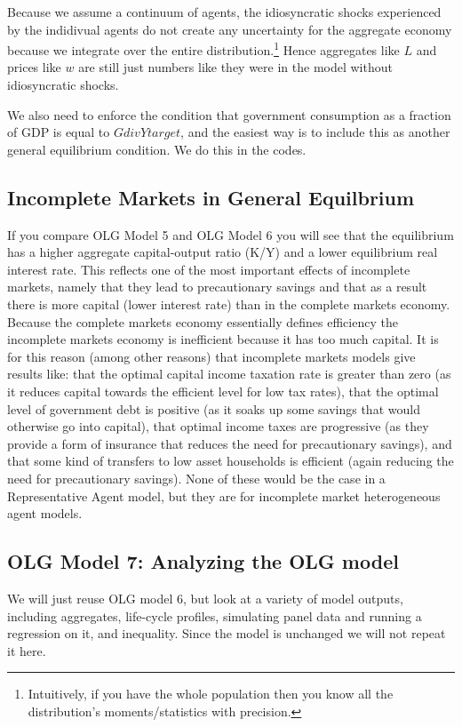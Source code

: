 Because we assume a continuum of agents, the idiosyncratic shocks experienced by the indidivual agents do not create any uncertainty for the aggregate economy because we integrate over the entire distribution.\footnote{Intuitively, if you have the whole population then you know all the distribution's moments/statistics with precision.} Hence aggregates like $L$ and prices like $w$ are still just numbers like they were in the model without idiosyncratic shocks.

We also need to enforce the condition that government consumption as a fraction of GDP is equal to $GdivYtarget$, and the easiest way is to include this as another general equilibrium condition. We do this in the codes.

\subsection{Incomplete Markets in General Equilbrium}
If you compare OLG Model 5 and OLG Model 6 you will see that the equilibrium has a higher aggregate capital-output ratio (K/Y) and a lower equilibrium real interest rate. This reflects one of the most important effects of incomplete markets, namely that they lead to precautionary savings and that as a result there is more capital (lower interest rate) than in the complete markets economy. Because the complete markets economy essentially defines efficiency the incomplete markets economy is inefficient because it has too much capital. It is for this reason (among other reasons) that incomplete markets models give results like: that the optimal capital income taxation rate is greater than zero (as it reduces capital towards the efficient level for low tax rates), that the optimal level of government debt is positive (as it soaks up some savings that would otherwise go into capital), that optimal income taxes are progressive (as they provide a form of insurance that reduces the need for precautionary savings), and that some kind of transfers to low asset households is efficient (again reducing the need for precautionary savings). None of these would be the case in a Representative Agent model, but they are for incomplete market heterogeneous agent models.

\subsection{OLG Model 7: Analyzing the OLG model}
We will just reuse OLG model 6, but look at a variety of model outputs, including aggregates, life-cycle profiles, simulating panel data and running a regression on it, and inequality. Since the model is unchanged we will not repeat it here.

